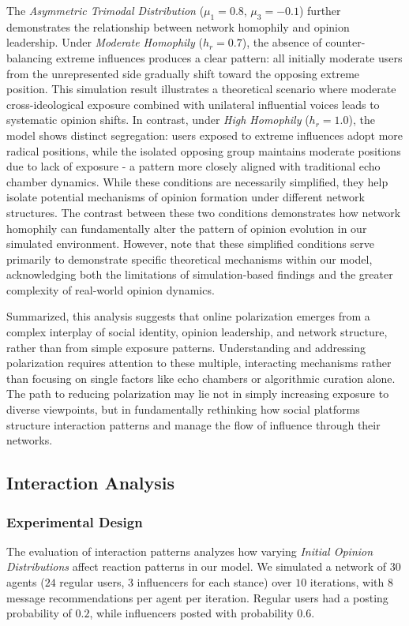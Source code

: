 The \emph{Asymmetric Trimodal Distribution} ($\mu_1 = 0.8$, $\mu_3 = -0.1$) further demonstrates the relationship between network homophily and opinion leadership. Under \emph{Moderate Homophily} ($h_r = 0.7$), the absence of counter-balancing extreme influences produces a clear pattern: all initially moderate users from the unrepresented side gradually shift toward the opposing extreme position. This simulation result illustrates a theoretical scenario where moderate cross-ideological exposure combined with unilateral influential voices leads to systematic opinion shifts. In contrast, under \emph{High Homophily} ($h_r = 1.0$), the model shows distinct segregation: users exposed to extreme influences adopt more radical positions, while the isolated opposing group maintains moderate positions due to lack of exposure - a pattern more closely aligned with traditional echo chamber dynamics. While these conditions are necessarily simplified, they help isolate potential mechanisms of opinion formation under different network structures. The contrast between these two conditions demonstrates how network homophily can fundamentally alter the pattern of opinion evolution in our simulated environment. However, note that these simplified conditions serve primarily to demonstrate specific theoretical mechanisms within our model, acknowledging both the limitations of simulation-based findings and the greater complexity of real-world opinion dynamics.

Summarized, this analysis suggests that online polarization emerges from a complex interplay of social identity, opinion leadership, and network structure, rather than from simple exposure patterns. Understanding and addressing polarization requires attention to these multiple, interacting mechanisms rather than focusing on single factors like echo chambers or algorithmic curation alone. The path to reducing polarization may lie not in simply increasing exposure to diverse viewpoints, but in fundamentally rethinking how social platforms structure interaction patterns and manage the flow of influence through their networks.

\subsection{Interaction Analysis}

\subsubsection{Experimental Design}
The evaluation of interaction patterns analyzes how varying \emph{Initial Opinion Distributions} affect reaction patterns in our model. We simulated a network of $30$ agents ($24$ regular users, $3$ influencers for each stance) over $10$ iterations, with $8$ message recommendations per agent per iteration. Regular users had a posting probability of $0.2$, while influencers posted with probability $0.6$.

